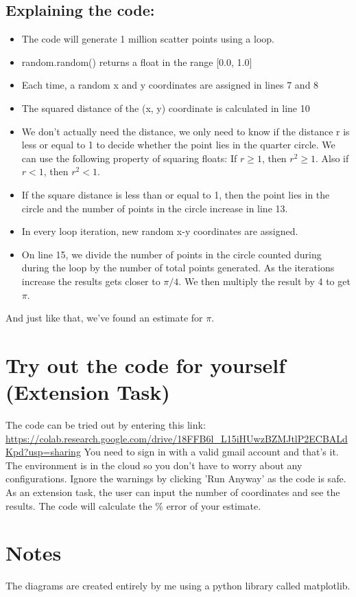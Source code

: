 \documentclass[11pt,a4paper]{amsart}
\begin{document}
\break

\subsection{Explaining the code:} 

\begin{itemize}
  \item The code will generate 1 million scatter points using a loop.
  \item random.random() returns a float in the range [0.0, 1.0]
  \item Each time, a random x and y coordinates are assigned in lines 7 and 8
  \item The squared distance of the (x, y) coordinate is calculated in line 10
  \item We don't actually need the distance, we only need to know if the distance r is less or equal to 1 to decide whether the point lies in the quarter circle. We can use the following property of squaring floats:
  If $r \geq 1$, then $r^2 \geq 1$. Also if $r < 1$, then $r^2 < 1$.
  \item If the square distance is less than or equal to 1, then the point lies in the circle and the number of points in the circle increase in line 13.
  \item In every loop iteration, new random x-y coordinates are assigned.
  \item On line 15, we divide the number of points in the circle counted during during the loop by the number of total points generated. As the iterations increase the results gets closer to $\pi/4$. We then multiply the result by 4 to get $\pi$.
\end{itemize}

And just like that, we've found an estimate for $\pi$.

\section{Try out the code for yourself (Extension Task)}

The code can be tried out by entering this link: \url{https://colab.research.google.com/drive/18FFB6l_L15iHUwzBZMJtlP2ECBALdKpd?usp=sharing} 
\newline You need to sign in with a valid gmail account and that's it. The environment is in the cloud so you don't have to worry about any configurations. Ignore the warnings by clicking 'Run Anyway' as the code is safe.
\newline As an extension task, the user can input the number of coordinates and see the results. The code will calculate the \% error of your estimate. 

\section{Notes}

The diagrams are created entirely by me using a python library called matplotlib. 
\end{document}
